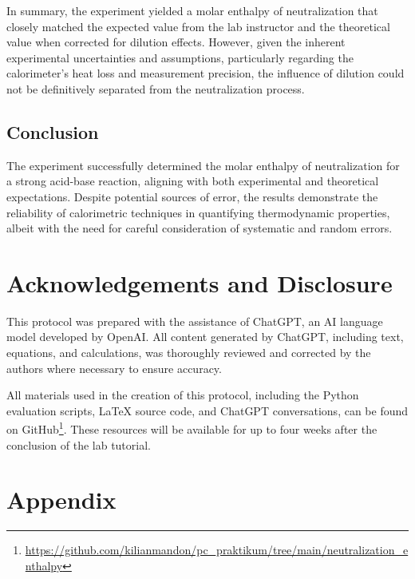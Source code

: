 \documentclass[a4paper,12pt]{article}
\begin{document}
In summary, the experiment yielded a molar enthalpy of neutralization that closely matched the expected value from the lab instructor and the theoretical value when corrected for dilution effects. However, given the inherent experimental uncertainties and assumptions, particularly regarding the calorimeter's heat loss and measurement precision, the influence of dilution could not be definitively separated from the neutralization process.

\subsection{Conclusion}
The experiment successfully determined the molar enthalpy of neutralization for a strong acid-base reaction, aligning with both experimental and theoretical expectations. Despite potential sources of error, the results demonstrate the reliability of calorimetric techniques in quantifying thermodynamic properties, albeit with the need for careful consideration of systematic and random errors.

\section{Acknowledgements and Disclosure}
This protocol was prepared with the assistance of ChatGPT, an AI language model developed by OpenAI. All content generated by ChatGPT, including text, equations, and calculations, was thoroughly reviewed and corrected by the authors where necessary to ensure accuracy.

All materials used in the creation of this protocol, including the Python evaluation scripts, LaTeX source code, and ChatGPT conversations, can be found on GitHub\footnote{\url{https://github.com/kilianmandon/pc_praktikum/tree/main/neutralization_enthalpy}}. These resources will be available for up to four weeks after the conclusion of the lab tutorial.

\newpage
\appendix
\section*{Appendix}
\end{document}
